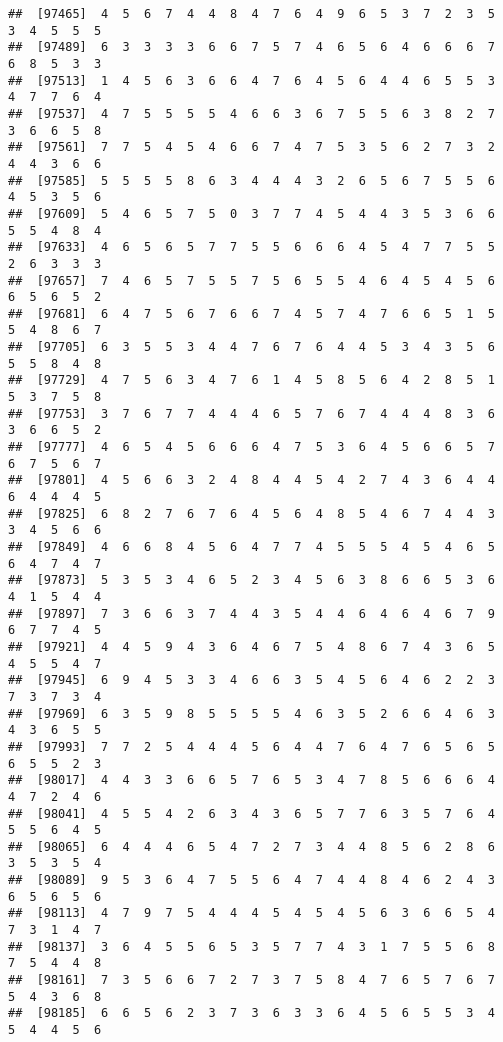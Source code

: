 \documentclass[
]{book}
\begin{document}
\begin{verbatim}
##  [97465]  4  5  6  7  4  4  8  4  7  6  4  9  6  5  3  7  2  3  5  3  4  5  5  5
##  [97489]  6  3  3  3  3  6  6  7  5  7  4  6  5  6  4  6  6  6  7  6  8  5  3  3
##  [97513]  1  4  5  6  3  6  6  4  7  6  4  5  6  4  4  6  5  5  3  4  7  7  6  4
##  [97537]  4  7  5  5  5  5  4  6  6  3  6  7  5  5  6  3  8  2  7  3  6  6  5  8
##  [97561]  7  7  5  4  5  4  6  6  7  4  7  5  3  5  6  2  7  3  2  4  4  3  6  6
##  [97585]  5  5  5  5  8  6  3  4  4  4  3  2  6  5  6  7  5  5  6  4  5  3  5  6
##  [97609]  5  4  6  5  7  5  0  3  7  7  4  5  4  4  3  5  3  6  6  5  5  4  8  4
##  [97633]  4  6  5  6  5  7  7  5  5  6  6  6  4  5  4  7  7  5  5  2  6  3  3  3
##  [97657]  7  4  6  5  7  5  5  7  5  6  5  5  4  6  4  5  4  5  6  6  5  6  5  2
##  [97681]  6  4  7  5  6  7  6  6  7  4  5  7  4  7  6  6  5  1  5  5  4  8  6  7
##  [97705]  6  3  5  5  3  4  4  7  6  7  6  4  4  5  3  4  3  5  6  5  5  8  4  8
##  [97729]  4  7  5  6  3  4  7  6  1  4  5  8  5  6  4  2  8  5  1  5  3  7  5  8
##  [97753]  3  7  6  7  7  4  4  4  6  5  7  6  7  4  4  4  8  3  6  3  6  6  5  2
##  [97777]  4  6  5  4  5  6  6  6  4  7  5  3  6  4  5  6  6  5  7  6  7  5  6  7
##  [97801]  4  5  6  6  3  2  4  8  4  4  5  4  2  7  4  3  6  4  4  6  4  4  4  5
##  [97825]  6  8  2  7  6  7  6  4  5  6  4  8  5  4  6  7  4  4  3  3  4  5  6  6
##  [97849]  4  6  6  8  4  5  6  4  7  7  4  5  5  5  4  5  4  6  5  6  4  7  4  7
##  [97873]  5  3  5  3  4  6  5  2  3  4  5  6  3  8  6  6  5  3  6  4  1  5  4  4
##  [97897]  7  3  6  6  3  7  4  4  3  5  4  4  6  4  6  4  6  7  9  6  7  7  4  5
##  [97921]  4  4  5  9  4  3  6  4  6  7  5  4  8  6  7  4  3  6  5  4  5  5  4  7
##  [97945]  6  9  4  5  3  3  4  6  6  3  5  4  5  6  4  6  2  2  3  7  3  7  3  4
##  [97969]  6  3  5  9  8  5  5  5  5  4  6  3  5  2  6  6  4  6  3  4  3  6  5  5
##  [97993]  7  7  2  5  4  4  4  5  6  4  4  7  6  4  7  6  5  6  5  6  5  5  2  3
##  [98017]  4  4  3  3  6  6  5  7  6  5  3  4  7  8  5  6  6  6  4  4  7  2  4  6
##  [98041]  4  5  5  4  2  6  3  4  3  6  5  7  7  6  3  5  7  6  4  5  5  6  4  5
##  [98065]  6  4  4  4  6  5  4  7  2  7  3  4  4  8  5  6  2  8  6  3  5  3  5  4
##  [98089]  9  5  3  6  4  7  5  5  6  4  7  4  4  8  4  6  2  4  3  6  5  6  5  6
##  [98113]  4  7  9  7  5  4  4  4  5  4  5  4  5  6  3  6  6  5  4  7  3  1  4  7
##  [98137]  3  6  4  5  5  6  5  3  5  7  7  4  3  1  7  5  5  6  8  7  5  4  4  8
##  [98161]  7  3  5  6  6  7  2  7  3  7  5  8  4  7  6  5  7  6  7  5  4  3  6  8
##  [98185]  6  6  5  6  2  3  7  3  6  3  3  6  4  5  6  5  5  3  4  5  4  4  5  6

\end{verbatim}
\end{document}
